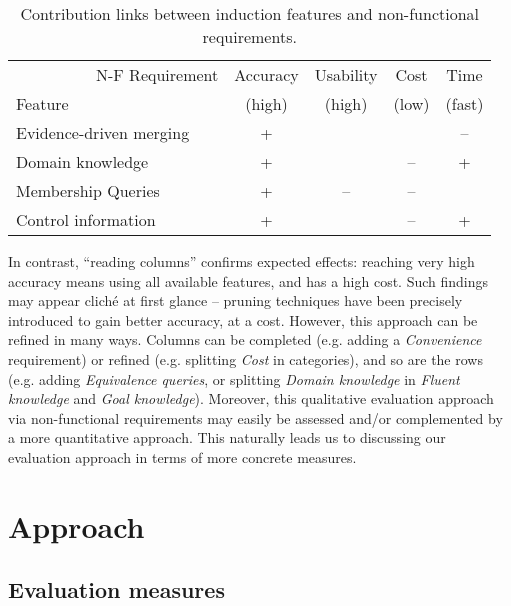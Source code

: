 \begin{table}[h]
\renewcommand{\arraystretch}{1.3}
\begin{center}
\begin{tabular}{| l || c | c | c | c |}
\hline
~~~~~~~~~~N-F Requirement & Accuracy &   Usability    &    Cost    & Time   \\
Feature                   &  (high)  &     (high)     &    (low)   & (fast) \\
\hline
\hline
Evidence-driven merging   &    +     &                &            &   --   \\
Domain knowledge          &    +     &                &     --     &   +    \\
Membership Queries        &    +     &       --       &     --     &        \\
Control information       &    +     &                &     --     &   +    \\
\hline
\end{tabular}
\end{center}
\caption{Contribution links between induction features and non-functional requirements.\label{table:evaluation-contribution-links}}
\end{table}

In contrast, ``reading columns'' confirms expected effects: reaching very high accuracy means using all available features, and has a high cost. Such findings may appear clich\'e at first glance -- pruning techniques have been precisely introduced to gain better accuracy, at a cost. However, this approach can be refined in many ways. Columns can be completed (e.g. adding a \emph{Convenience} requirement) or refined (e.g. splitting \emph{Cost} in categories), and so are the rows (e.g. adding \emph{Equivalence queries}, or splitting \emph{Domain knowledge} in \emph{Fluent knowledge} and \emph{Goal knowledge}). Moreover, this qualitative evaluation approach via non-functional requirements may easily be assessed and/or complemented by a more quantitative approach. This naturally leads us to discussing our evaluation approach in terms of more concrete measures.

\section{Approach\label{section:evaluation-approach}}

\subsection*{Evaluation measures}

